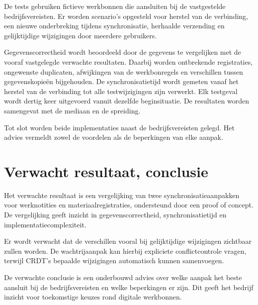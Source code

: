 De tests gebruiken fictieve werkbonnen die aansluiten bij de vastgestelde bedrijfsvereisten. Er worden scenario's opgesteld voor
herstel van de verbinding, een nieuwe onderbreking tijdens synchronisatie, herhaalde verzending en gelijktijdige
wijzigingen door meerdere gebruikers.

Gegevenscorrectheid wordt beoordeeld door de gegevens te vergelijken met de vooraf vastgelegde verwachte resultaten.
Daarbij worden ontbrekende registraties, ongewenste duplicaten, afwijkingen van de werkbonregels en verschillen tussen gegevenskopieën
bijgehouden. De synchronisatietijd wordt gemeten
vanaf het herstel van de verbinding tot alle testwijzigingen zijn verwerkt. Elk testgeval wordt dertig keer uitgevoerd vanuit dezelfde
beginsituatie. De resultaten worden samengevat met de mediaan en de spreiding.

Tot slot worden beide implementaties naast de bedrijfsvereisten gelegd. Het advies vermeldt zowel de voordelen als de beperkingen
van elke aanpak.

\section{Verwacht resultaat, conclusie}%
\label{sec:verwachte_resultaten}

Het verwachte resultaat is een vergelijking van twee synchronisatieaanpakken
voor werknotities en materiaalregistraties, ondersteund door een proof of
concept. De vergelijking geeft inzicht in gegevenscorrectheid,
synchronisatietijd en implementatiecomplexiteit.

Er wordt verwacht dat de verschillen vooral bij gelijktijdige wijzigingen zichtbaar zullen worden.
De wachtrijaanpak kan hierbij expliciete
conflictcontrole vragen, terwijl CRDT's bepaalde wijzigingen automatisch
kunnen samenvoegen.

De verwachte conclusie is een onderbouwd advies over welke aanpak het
beste aansluit bij de bedrijfsvereisten en welke beperkingen er zijn.
Dit geeft het bedrijf inzicht voor toekomstige keuzes rond
digitale werkbonnen.